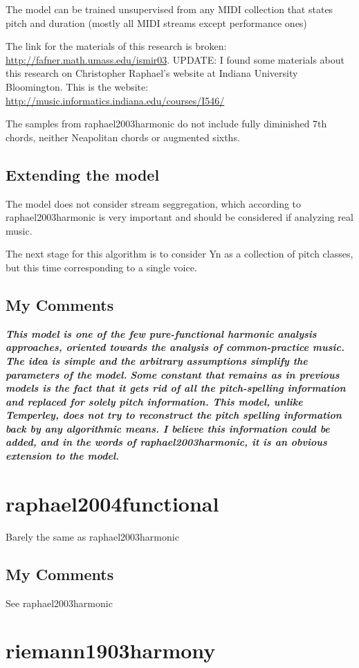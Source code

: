     The model can be trained unsupervised from any MIDI collection that states pitch and duration (mostly all MIDI streams except performance ones)

    The link for the materials of this research is broken: \url{http://fafner.math.umass.edu/ismir03}. UPDATE: I found some materials about this research on Christopher Raphael's website at Indiana University Bloomington. This is the website: \url{http://music.informatics.indiana.edu/courses/I546/}

    The samples from raphael2003harmonic do not include fully diminished 7th chords, neither Neapolitan chords or augmented sixths.

  \subsection{Extending the model}
    The model does not consider stream seggregation, which according to raphael2003harmonic is very important and should be considered if analyzing real music.

    The next stage for this algorithm is to consider Yn as a collection of pitch classes, but this time corresponding to a single voice.

  \subsection{My Comments}
    \emph{\textbf{
      This model is one of the few pure-functional harmonic analysis approaches, oriented towards the analysis of common-practice music. The idea is simple and the arbitrary assumptions simplify the parameters of the model.
    }}
    \emph{\textbf{
      Some constant that remains as in previous models is the fact that it gets rid of all the pitch-spelling information and replaced for solely pitch information. This model, unlike Temperley, does not try to reconstruct the pitch spelling information back by any algorithmic means. I believe this information could be added, and in the words of raphael2003harmonic, it is an obvious extension to the model.
    }}
\section{raphael2004functional }
  Barely the same as raphael2003harmonic
  \subsection{My Comments}
    See raphael2003harmonic
\section{riemann1903harmony }
